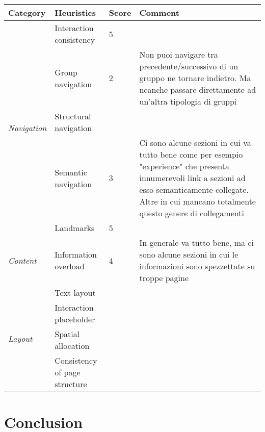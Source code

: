 \documentclass[a4paper, 11pt, parskip=half]{scrreprt}
\begin{document}
\begin{center}
    \def\arraystretch{1.3}
    \begin{tabular}{|l|l|l|m{7cm}|}
        \hline
        \textbf{Category} & \textbf{Heuristics} & \textbf{Score} & \textbf{Comment} \\ \hline
        \multirow{5}{*}{\textit{Navigation}} 
        & Interaction consistency & 5 & \\ \cline{2-4}
        & Group navigation & 2 & Non puoi navigare tra precedente/successivo di un gruppo ne tornare indietro. Ma neanche passare direttamente ad un'altra tipologia di gruppi\\ \cline{2-4}
        & Structural navigation &  & \\ \cline{2-4}
        & Semantic navigation & 3 & Ci sono alcune sezioni in cui va tutto bene come per esempio "experience" che presenta innumerevoli link a sezioni ad esso semanticamente collegate. Altre in cui mancano totalmente questo genere di collegamenti\\ \cline{2-4}
        & Landmarks & 5 & \\ \hline
        \multirow{1}{*}{\textit{Content}} & Information overload & 4 & In generale va tutto bene, ma ci sono alcune sezioni in cui le informazioni sono spezzettate su troppe pagine\\ \hline
        \multirow{4}{*}{\textit{Layout}} & Text layout & & \\ \cline{2-4}
        & Interaction placeholder & & \\ \cline{2-4}
        & Spatial allocation & & \\ \cline{2-4}
        & Consistency of page structure & & \\ \hline
    \end{tabular}
\end{center}






\chapter{Conclusion}

\end{document}
